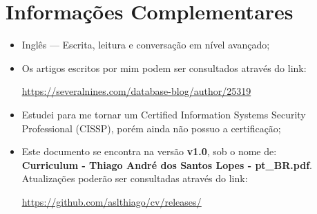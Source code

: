 \section{Informações Complementares}

\begin{itemize}
  \item Inglês --- Escrita, leitura e conversação em nível avançado;
  \item Os artigos escritos por mim podem ser consultados através do link:

    \underline{\href{https://severalnines.com/database-blog/author/25319}
    {https://severalnines.com/database-blog/author/25319}}

  \item Estudei para me tornar um Certified Information Systems Security
    Professional (CISSP), porém ainda não possuo a certificação;

  \item Este documento se encontra na versão \textbf{v1.0}, sob o nome de:\\
    \textbf{Curriculum - Thiago André dos Santos Lopes - pt\_BR.pdf}.\\
    Atualizações poderão ser consultadas através do link:

    \underline{\href{https://github.com/aslthiago/cv/releases/}
    {https://github.com/aslthiago/cv/releases/}}
\end{itemize}

